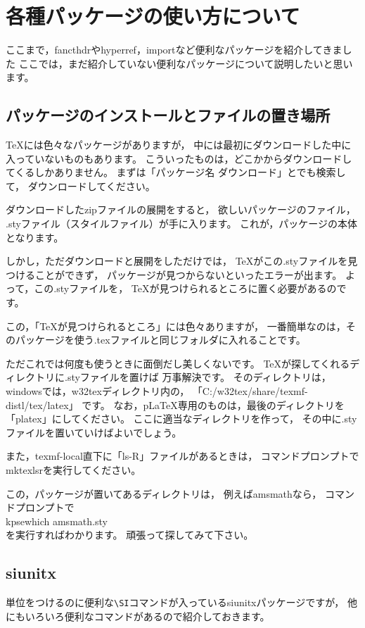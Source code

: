 \chapter{各種パッケージの使い方について}

ここまで，fancthdrやhyperref，importなど便利なパッケージを紹介してきました
ここでは，まだ紹介していない便利なパッケージについて説明したいと思います。



\section{パッケージのインストールとファイルの置き場所}
{\TeX}には色々なパッケージがありますが，
中には最初にダウンロードした中に入っていないものもあります。
こういったものは，どこかからダウンロードしてくるしかありません。
まずは「パッケージ名 ダウンロード」とでも検索して，
ダウンロードしてください。

ダウンロードしたzipファイルの展開をすると，
欲しいパッケージのファイル，
.styファイル（スタイルファイル）が手に入ります。
これが，パッケージの本体となります。

しかし，ただダウンロードと展開をしただけでは，
{\TeX}がこの.styファイルを見つけることができず，
パッケージが見つからないといったエラーが出ます。
よって，この.styファイルを，
{\TeX}が見つけられるところに置く必要があるのです。

この，「{\TeX}が見つけられるところ」には色々ありますが，
一番簡単なのは，そのパッケージを使う.texファイルと同じフォルダに入れることです。

ただこれでは何度も使うときに面倒だし美しくないです。
{\TeX}が探してくれるディレクトリに.styファイルを置けば
万事解決です。
そのディレクトリは，
windowsでは，w32texディレクトリ内の，
「C:/w32tex/share/texmf-distl/tex/latex」
です。
なお，p{\LaTeX}専用のものは，最後のディレクトリを「platex」にしてください。
ここに適当なディレクトリを作って，
その中に.styファイルを置いていけばよいでしょう。

また，texmf-local直下に「ls-R」ファイルがあるときは，
コマンドプロンプトでmktexlsrを実行してください。

この，パッケージが置いてあるディレクトリは，
例えばamsmathなら，
コマンドプロンプトで\\
\hspace{5zw} kpsewhich amsmath.sty \\
を実行すればわかります。
頑張って探してみて下さい。



\section{siunitx}
単位をつけるのに便利な\verb|\SI|コマンドが入っているsiunitxパッケージですが，
他にもいろいろ便利なコマンドがあるので紹介しておきます。



